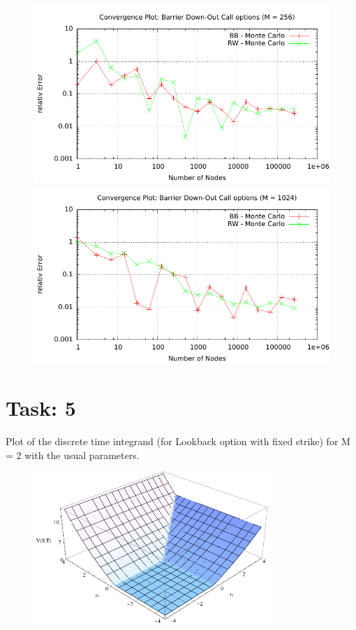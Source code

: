 \documentclass{article}
\begin{document}
 \begin{figure}[htbp]
	\begin{minipage}[b]{0.5\textwidth}
      \includegraphics[width=1.0\textwidth]{../Task04/sh4_task04_convergencePlot_M=256.pdf}
    \end{minipage}
	\begin{minipage}[b]{0.5\textwidth}
   	\includegraphics[width=1.0\textwidth]{../Task04/sh4_task04_convergencePlot_M=1024.pdf}	
    \end{minipage}
  \end{figure}

\section*{Task: 5}
Plot of the discrete time integrand (for Lookback option with fixed strike) for M = 2 with the usual parameters.
\begin{figure}[htbp]
  \centering
     \includegraphics[width=0.8\textwidth]{../Task05/task05_plot.pdf}
\end{figure}
\end{document}
